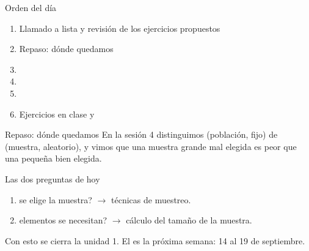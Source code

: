\documentclass[aspectratio=169,10pt]{beamer}
\begin{document}
\portada

\begin{frame}{Orden del día}
  \begin{enumerate}
    \item Llamado a lista y revisión de los ejercicios propuestos
    \item Repaso: dónde quedamos
    \item {}
    \item {}
    \item {}
    \item Ejercicios en clase y 
  \end{enumerate}
\end{frame}

\begin{frame}{Repaso: dónde quedamos}
  En la sesión 4 distinguimos  (población, fijo) de
   (muestra, aleatorio), y vimos que una muestra grande mal
  elegida es peor que una pequeña bien elegida.

  \vspace{0.25cm}
  \begin{alertblock}{Las dos preguntas de hoy}
    \footnotesize
    \begin{enumerate}
      \item {} se elige la muestra? $\rightarrow$ técnicas de
            muestreo.
      \item {} elementos se necesitan? $\rightarrow$ cálculo
            del tamaño de la muestra.
    \end{enumerate}
  \end{alertblock}

  \vspace{0.15cm}
  {\footnotesize\color{uniGris} Con esto se cierra la unidad 1. El
   es la próxima semana: 14 al 19 de septiembre.}
\end{frame}

\end{document}
